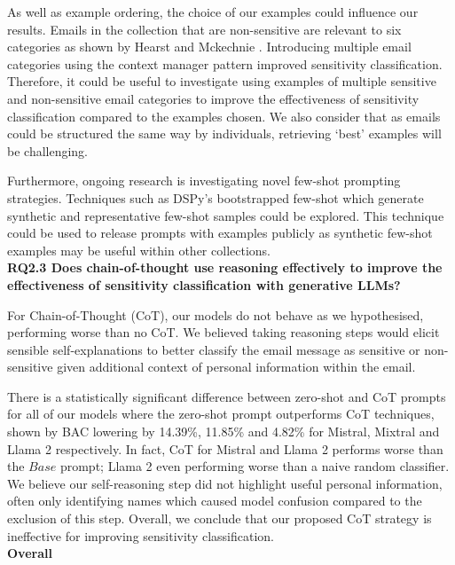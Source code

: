 As well as example ordering, the choice of our examples could influence our results. Emails in the collection that are non-sensitive are relevant to six categories as shown by Hearst \cite{hearst2005teaching} and Mckechnie \cite{mckechnie2024sara}. Introducing multiple email categories using the context manager pattern improved sensitivity classification. Therefore, it could be useful to investigate using examples of multiple sensitive and non-sensitive email categories to improve the effectiveness of sensitivity classification compared to the examples chosen. We also consider that as emails could be structured the same way by individuals, retrieving `best' examples will be challenging.

Furthermore, ongoing research is investigating novel few-shot prompting strategies. Techniques such as DSPy’s bootstrapped few-shot which generate synthetic and representative few-shot samples could be explored. This technique could be used to release prompts with examples publicly as synthetic few-shot examples may be useful within other collections. \\

\textbf{RQ2.3 Does chain-of-thought use reasoning effectively to improve the effectiveness of sensitivity classification with generative LLMs?}

For Chain-of-Thought (CoT), our models do not behave as we hypothesised, performing worse than no CoT. We believed taking reasoning steps would elicit sensible self-explanations to better classify the email message as sensitive or non-sensitive given additional context of personal information within the email.

There is a statistically significant difference between zero-shot and CoT prompts for all of our models where the zero-shot prompt outperforms CoT techniques, shown by BAC lowering by 14.39\%, 11.85\% and 4.82\% for Mistral, Mixtral and Llama 2 respectively. In fact, CoT for Mistral and Llama 2 performs worse than the $Base$ prompt; Llama 2 even performing worse than a naive random classifier. We believe our self-reasoning step did not highlight useful personal information, often only identifying names which caused model confusion compared to the exclusion of this step. Overall, we conclude that our proposed CoT strategy is ineffective for improving sensitivity classification. \\

\textbf{Overall}

